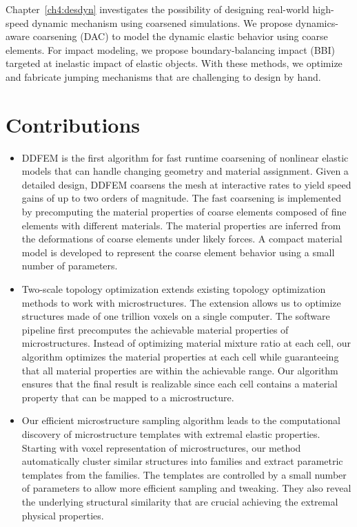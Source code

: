 Chapter~\ref{ch4:desdyn} investigates the possibility of designing real-world high-speed dynamic mechanism using coarsened simulations.
We propose dynamics-aware coarsening (DAC) to model the dynamic elastic behavior using coarse elements.
For impact modeling, we propose boundary-balancing impact (BBI) targeted at inelastic impact of elastic objects.
With these methods, we optimize and fabricate jumping mechanisms that are challenging to design by hand.
\section{Contributions}
\begin{itemize}
	\item DDFEM is the first algorithm for fast runtime coarsening of nonlinear elastic models that can handle changing geometry and material assignment. Given a detailed design, DDFEM coarsens the mesh at interactive rates to yield speed gains of up to two orders of magnitude.
	The fast coarsening is implemented by precomputing the material properties of coarse elements composed of fine elements with different materials.
	The material properties are inferred from the deformations of coarse elements under likely forces.
	A compact material model is developed to represent the coarse element behavior using a small number of parameters.
	\item Two-scale topology optimization extends existing topology optimization methods to work with microstructures.
	The extension allows us to optimize structures made of one trillion voxels on a single computer.
	The software pipeline first precomputes the achievable material properties of microstructures.
	Instead of optimizing material mixture ratio at each cell, our algorithm optimizes the material properties at each cell while guaranteeing that all material properties are within the achievable range.
	Our algorithm ensures that the final result is realizable since each cell contains a material property that can be mapped to a microstructure.
	\item Our efficient microstructure sampling algorithm leads to the computational discovery of microstructure templates with extremal elastic properties.
	Starting with voxel representation of microstructures,
	our method automatically cluster similar structures into families and extract parametric templates from the families.
	The templates are controlled by a small number of parameters to allow more efficient sampling and tweaking.
	They also reveal the underlying structural similarity that are crucial achieving the extremal physical properties.	

\end{itemize}
